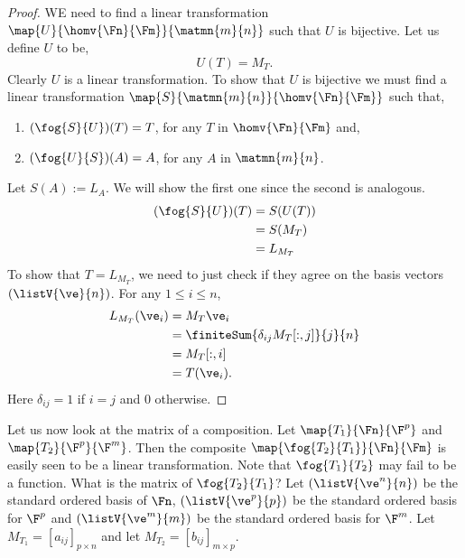 \begin{proof}
    WE need to find a linear transformation $\map{U}{\homv{\Fn}{\Fm}}{\matmn{m}{n}}$ such that $U$ is
    bijective.
    Let us define $U$ to be,
    \[U(T) = M_{T}.\]
    Clearly $U$ is a linear transformation. To show that $U$ is bijective we must find a linear transformation
    $\map{S}{\matmn{m}{n}}{\homv{\Fn}{\Fm}}$ such that,
    \begin{enumerate}
	\item
	    $(\fog{S}{U})(T) = T$, for any $T$ in $\homv{\Fn}{\Fm}$ and,
	\item
	    $(\fog{U}{S})(A) = A$, for any $A$ in $\matmn{m}{n}$. 
    \end{enumerate}
    Let $S(A) := L_{A}$.
    We will show the first one since the second is analogous.
    \begin{align*}
	(\fog{S}{U})(T) &= S(U(T)) \\
	&= S(M_{T})\\
	&= L_{M_{T}}
    \end{align*}
    To show that $T = L_{M_{T}}$, we need to just check if they agree on the basis vectors $(\listV{\ve}{n})$.
    For any $1\leq i \leq n$,
    \begin{align*}
	L_{M_{T}}(\ve_{i}) &= M_{T}\ve_{i}\\
	&= \finiteSum{\delta_{ij}M_{T}[:,j]}{j}{n}\\
	&= M_{T}[:,i]\\
	&= T(\ve_{i}).
    \end{align*}
    Here $\delta_{ij} = 1$ if $i =j$ and $0$ otherwise.
\end{proof}

Let us now look at the matrix of a composition. Let $\map{T_1}{\Fn}{\F^p}$ and $\map{T_2}{\F^p}{\F^m}$. Then
the composite $\map{\fog{T_2}{T_1}}{\Fn}{\Fm}$ is easily seen to be a linear transformation. Note that
$\fog{T_1}{T_2}$ may fail to be a function. What is the matrix of $\fog{T_2}{T_1}$?
Let $\left(\listV{\ve^{n}}{n}\right)$ be the standard ordered basis of $\Fn$,  
$\left(\listV{\ve^{p}}{p}\right)$ be the standard ordered basis for $\F^{p}$
and $\left(\listV{\ve^{m}}{m}\right)$ be the standard ordered basis for $\F^{m}$.
Let $M_{T_1} = {[a_{ij}]}_{p\times n}$ and let $M_{T_2} = {[b_{ij}]}_{m\times p}$.

